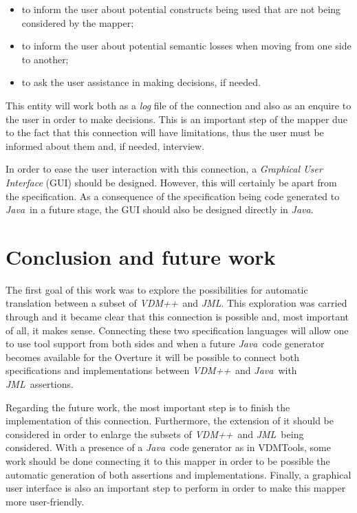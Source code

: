 \documentclass{llncs}
\newcommand{\jml}{\textit{JML}}
\newcommand{\vpp}{\textit{VDM++}}
\newcommand{\java}{\textit{Java}}
\begin{document}
\begin{itemize}
\item to inform the user about potential constructs being used that are not being considered by the mapper;
\item to inform the user about potential semantic losses when moving from one side to another;
\item to ask the user assistance in making decisions, if needed.
\end{itemize}

This entity will work both as a \textit{log} file of the connection and also as an enquire to the user in order to make decisions. This is an important step of the mapper due to the fact that this connection will have limitations, thus the user must be informed about them and, if needed, interview. 

In order to ease the user interaction with this connection, a \textit{Graphical User Interface} (GUI) should be designed. However, this will certainly be apart from the specification. As a consequence of the specification being code generated to \java\ in a future stage, the GUI should also be designed directly in \java.

\section{Conclusion and future work}
\label{sec:conc}

The first goal of this work was to explore the possibilities for automatic translation between a subset of \vpp\ and \jml. This exploration was carried through and it became clear that this connection is possible and, most important of all, it makes sense. Connecting these two specification languages will allow one to use tool support from both sides and when a future \java\ code generator becomes available for the Overture it will be possible to connect both specifications and implementations between \vpp\ and \java\ with \jml\ assertions. 

Regarding the future work, the most important step is to finish the implementation of this connection. Furthermore, the extension of it should be considered in order to enlarge the subsets of \vpp\ and \jml\ being considered. With a presence of a \java\ code generator as in VDMTools, some work should be done connecting it to this mapper in order to be possible the automatic generation of both assertions and implementations. Finally, a graphical user interface is also an important step to perform in order to make this mapper more user-friendly.



\end{document}
